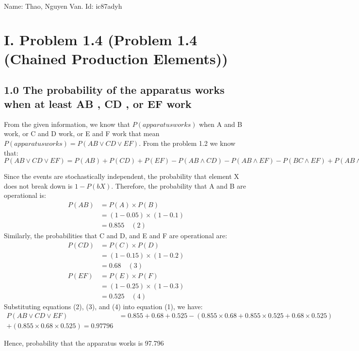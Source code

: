 \documentclass{article}
\begin{document}
Name: Thao, Nguyen Van.   Id: ic87adyh
\section*{\textbf{I. Problem 1.4 (Problem 1.4 (Chained Production Elements))}}

\subsection*{\textbf{1.0 The probability of the apparatus works when at least   AB ,  CD ,  or EF work }}

From the given information,  we know that $ P(apparatus works)$ when A and B work,  or C and D work, or E and F work that mean $P(apparatus works) = P(AB \lor  CD \lor EF)$. From the problem 1.2 we know that: \\
$ P(AB \lor  CD \lor EF) = P(AB) + P(CD) + P(EF) - P(AB \land CD) - P(AB \land EF) - P(BC \land EF) + P(AB \land CD \land EF) \quad (1)$

	Since the events are stochastically independent, the probability that element X does not break down is $1 - P(bX)$. Therefore, the probability that A and B are operational is:
\begin{align*}
    P(AB) &= P(A) \times P(B) \\
          &= (1-0.05) \times (1-0.1) \\
          &= 0.855 \quad (2)
\end{align*}
Similarly, the probabilities that C and D, and E and F are operational are:
\begin{align*}
    P(CD) &= P(C) \times P(D) \\
          &= (1-0.15) \times (1-0.2) \\
          &= 0.68 \quad (3) \\
    P(EF) &= P(E) \times P(F) \\
          &= (1-0.25) \times (1-0.3) \\
          &= 0.525 \quad (4)
\end{align*}
Substituting equations (2), (3), and (4) into equation (1), we have:
	\begin{align*}
    P(AB \lor  CD \lor EF) &= 0.855 + 0.68 + 0.525  - (0.855 \times 0.68 + 0.855   \times 0.525  + 0.68 \times 0.525 ) \\+  (0.855  \times 0.68  \times 0.525)   = 0.97796
	\end{align*}
	
	Hence,  probability that the apparatus works is 97.796%
	
\end{document}
